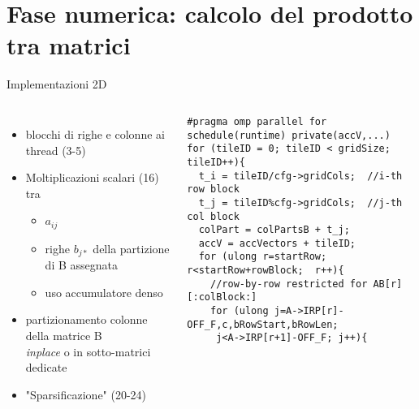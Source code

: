 
\section{Fase numerica: calcolo del prodotto tra matrici}

\begin{frame}[fragile]  {Implementazioni 2D}
\begin{columns}
	\begin{itemize}
		\item	blocchi di righe e colonne ai thread (3-5)
		\item	Moltiplicazioni scalari (16) tra
		\begin{itemize}
			\item	$a_{ij}$
			\item	righe $b_{j*}$ della partizione di B assegnata
			\item	uso accumulatore denso
		\end{itemize}
		\item	partizionamento colonne della matrice B\\
				\emph{inplace} o in sotto-matrici dedicate
		\item	"Sparsificazione" (20-24)
	\end{itemize}

	\begin{lstlisting}
#pragma omp parallel for schedule(runtime) private(accV,...)
for (tileID = 0; tileID < gridSize; tileID++){
  t_i = tileID/cfg->gridCols;  //i-th row block
  t_j = tileID%cfg->gridCols;  //j-th col block
  colPart = colPartsB + t_j;
  accV = accVectors + tileID; 
  for (ulong r=startRow;  r<startRow+rowBlock;  r++){
    //row-by-row restricted for AB[r][:colBlock:]
    for (ulong j=A->IRP[r]-OFF_F,c,bRowStart,bRowLen; 
     j<A->IRP[r+1]-OFF_F; j++){


\end{lstlisting}
\end{columns}
\end{frame}
